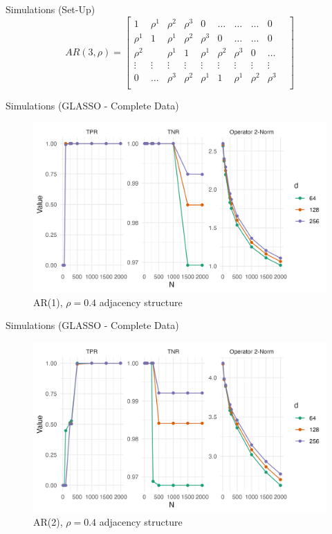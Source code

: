\documentclass{beamer}
\begin{document}
\begin{frame}{Simulations (Set-Up)}
    \[
    AR(3, \rho) = \begin{bmatrix}
        1 & \rho^1 & \rho^2 & \rho^3 &  0 & \dots & \dots & \dots & 0 \\
        \rho^1 & 1 & \rho^1 & \rho^2 & \rho^3 &  0 & \dots & \dots & 0 \\
        \rho^2 & & \rho^1 & 1 & \rho^1 & \rho^2 & \rho^3 & 0 & \dots\\
        \vdots &\vdots &\vdots &\vdots &\vdots &\vdots &\vdots &\vdots &\vdots &\\
        0 & \dots & \rho^3 & \rho^2 & \rho^1 & 1 & \rho^1 & \rho^2 & \rho^3 \\ 
    \end{bmatrix}
    \]
\end{frame}


\begin{frame}{Simulations (GLASSO - Complete Data)}
    \begin{figure}
        \centering 
        \includegraphics[scale=0.65]{glasso_complete_fixN_b1.png}
        \caption{AR(1), $\rho=0.4$ adjacency structure}
    \end{figure}
\end{frame}


\begin{frame}{Simulations (GLASSO - Complete Data)}
    \begin{figure}
        \centering 
        \includegraphics[scale=0.65]{glasso_complete_fixN_b2.png}
        \caption{AR(2), $\rho=0.4$ adjacency structure}
    \end{figure}
\end{frame}
\end{document}
